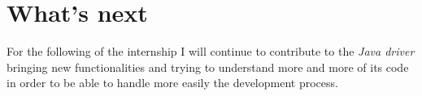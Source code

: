 \documentclass[a4paper]{report}
\newcommand{\jd}{\emph{Java driver\xspace}}
\begin{document}
\chapter{What's next}
For the following of the internship I will continue to contribute to the \jd{} bringing new functionalities and trying to understand more and more of its code in order to be able to handle more easily the development process.










\end{document}
